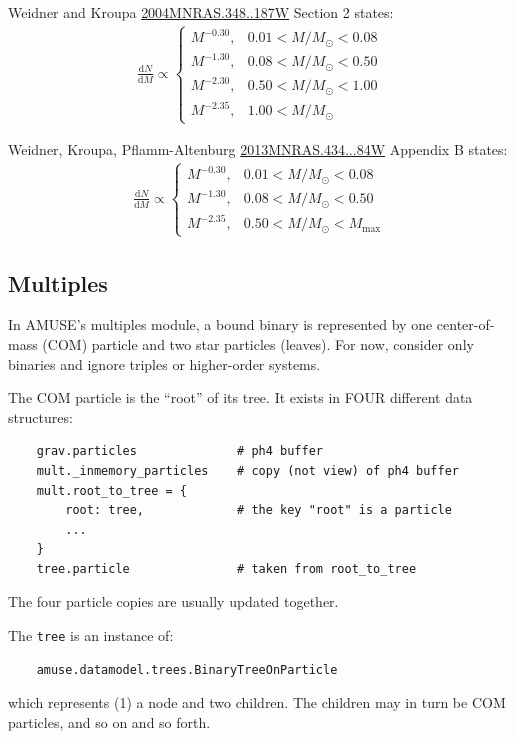 \documentclass[10pt]{article}
\newcommand*{\Msun}{M_\odot}
\begin{document}
Weidner and Kroupa
\href{http://adsabs.harvard.edu/abs/2004MNRAS.348..187W}{2004MNRAS.348..187W}
Section 2 states:
\begin{align*}
    \frac{\mathrm{d} N}{\mathrm{d} M} \propto
    \begin{cases}
        M^{-0.30}, & 0.01 < M/\Msun < 0.08 \\
        M^{-1.30}, & 0.08 < M/\Msun < 0.50 \\
        M^{-2.30}, & 0.50 < M/\Msun < 1.00 \\
        M^{-2.35}, & 1.00 < M/\Msun
    \end{cases}
\end{align*}

Weidner, Kroupa, Pflamm-Altenburg
\href{http://adsabs.harvard.edu/abs/2013MNRAS.434...84W}{2013MNRAS.434...84W}
Appendix B states:
\begin{align*}
    \frac{\mathrm{d} N}{\mathrm{d} M} \propto
    \begin{cases}
        M^{-0.30}, & 0.01 < M/\Msun < 0.08 \\
        M^{-1.30}, & 0.08 < M/\Msun < 0.50 \\
        M^{-2.35}, & 0.50 < M/\Msun < M_\mathrm{max}
    \end{cases}
\end{align*}


\subsection{Multiples}

In AMUSE's multiples module, a bound binary is represented by one
center-of-mass (COM) particle and two star particles (leaves).  For now,
consider only binaries and ignore triples or higher-order systems.

The COM particle is the ``root'' of its tree.  It exists in FOUR different data
structures:
\begin{verbatim}
    grav.particles              # ph4 buffer
    mult._inmemory_particles    # copy (not view) of ph4 buffer
    mult.root_to_tree = {
        root: tree,             # the key "root" is a particle
        ...
    }
    tree.particle               # taken from root_to_tree
\end{verbatim}
The four particle copies are usually updated together.

The \texttt{tree} is an instance of:
\begin{verbatim}
    amuse.datamodel.trees.BinaryTreeOnParticle
\end{verbatim}
which represents (1) a node and two children.  The children may in turn be COM
particles, and so on and so forth.
\end{document}
